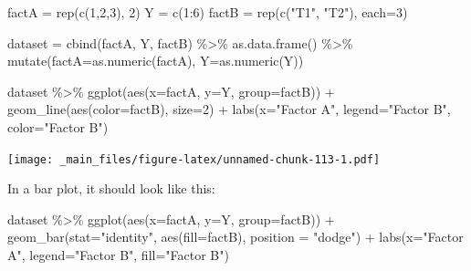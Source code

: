 \documentclass[
]{book}
\newenvironment{Shaded}{\begin{snugshade}}{\end{snugshade}}
\newcommand{\AttributeTok}[1]{\textcolor[rgb]{0.77,0.63,0.00}{#1}}
\newcommand{\DecValTok}[1]{\textcolor[rgb]{0.00,0.00,0.81}{#1}}
\newcommand{\FunctionTok}[1]{\textcolor[rgb]{0.00,0.00,0.00}{#1}}
\newcommand{\NormalTok}[1]{#1}
\newcommand{\OtherTok}[1]{\textcolor[rgb]{0.56,0.35,0.01}{#1}}
\newcommand{\SpecialCharTok}[1]{\textcolor[rgb]{0.00,0.00,0.00}{#1}}
\newcommand{\StringTok}[1]{\textcolor[rgb]{0.31,0.60,0.02}{#1}}
\begin{document}
\begin{Shaded}
\begin{Highlighting}[]
\NormalTok{factA }\OtherTok{=} \FunctionTok{rep}\NormalTok{(}\FunctionTok{c}\NormalTok{(}\DecValTok{1}\NormalTok{,}\DecValTok{2}\NormalTok{,}\DecValTok{3}\NormalTok{), }\DecValTok{2}\NormalTok{)}
\NormalTok{Y }\OtherTok{=} \FunctionTok{c}\NormalTok{(}\DecValTok{1}\SpecialCharTok{:}\DecValTok{6}\NormalTok{)}
\NormalTok{factB }\OtherTok{=} \FunctionTok{rep}\NormalTok{(}\FunctionTok{c}\NormalTok{(}\StringTok{"T1"}\NormalTok{, }\StringTok{"T2"}\NormalTok{), }\AttributeTok{each=}\DecValTok{3}\NormalTok{)}

\NormalTok{dataset }\OtherTok{=} \FunctionTok{cbind}\NormalTok{(factA, Y, factB) }\SpecialCharTok{\%\textgreater{}\%}
  \FunctionTok{as.data.frame}\NormalTok{() }\SpecialCharTok{\%\textgreater{}\%}
  \FunctionTok{mutate}\NormalTok{(}\AttributeTok{factA=}\FunctionTok{as.numeric}\NormalTok{(factA),}
         \AttributeTok{Y=}\FunctionTok{as.numeric}\NormalTok{(Y)) }

\NormalTok{dataset }\SpecialCharTok{\%\textgreater{}\%}
  \FunctionTok{ggplot}\NormalTok{(}\FunctionTok{aes}\NormalTok{(}\AttributeTok{x=}\NormalTok{factA, }\AttributeTok{y=}\NormalTok{Y, }\AttributeTok{group=}\NormalTok{factB)) }\SpecialCharTok{+}
  \FunctionTok{geom\_line}\NormalTok{(}\FunctionTok{aes}\NormalTok{(}\AttributeTok{color=}\NormalTok{factB), }\AttributeTok{size=}\DecValTok{2}\NormalTok{) }\SpecialCharTok{+}
  \FunctionTok{labs}\NormalTok{(}\AttributeTok{x=}\StringTok{"Factor A"}\NormalTok{, }\AttributeTok{legend=}\StringTok{"Factor B"}\NormalTok{, }\AttributeTok{color=}\StringTok{"Factor B"}\NormalTok{)}
\end{Highlighting}
\end{Shaded}

\texttt{[image: \_main\_files/figure-latex/unnamed-chunk-113-1.pdf]}

In a bar plot, it should look like this:

\begin{Shaded}
\begin{Highlighting}[]
\NormalTok{dataset }\SpecialCharTok{\%\textgreater{}\%}
  \FunctionTok{ggplot}\NormalTok{(}\FunctionTok{aes}\NormalTok{(}\AttributeTok{x=}\NormalTok{factA, }\AttributeTok{y=}\NormalTok{Y, }\AttributeTok{group=}\NormalTok{factB)) }\SpecialCharTok{+}
  \FunctionTok{geom\_bar}\NormalTok{(}\AttributeTok{stat=}\StringTok{"identity"}\NormalTok{, }\FunctionTok{aes}\NormalTok{(}\AttributeTok{fill=}\NormalTok{factB), }\AttributeTok{position =} \StringTok{"dodge"}\NormalTok{) }\SpecialCharTok{+}
  \FunctionTok{labs}\NormalTok{(}\AttributeTok{x=}\StringTok{"Factor A"}\NormalTok{, }\AttributeTok{legend=}\StringTok{"Factor B"}\NormalTok{, }\AttributeTok{fill=}\StringTok{"Factor B"}\NormalTok{)}
\end{Highlighting}
\end{Shaded}
\end{document}

